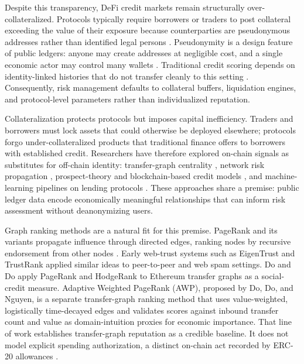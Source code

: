 Despite this transparency, DeFi credit markets remain structurally over-collateralized. Protocols typically require borrowers or traders to post collateral exceeding the value of their exposure because counterparties are pseudonymous addresses rather than identified legal persons . Pseudonymity is a design feature of public ledgers: anyone may create addresses at negligible cost, and a single economic actor may control many wallets . Traditional credit scoring depends on identity-linked histories that do not transfer cleanly to this setting . Consequently, risk management defaults to collateral buffers, liquidation engines, and protocol-level parameters rather than individualized reputation.

Collateralization protects protocols but imposes capital inefficiency. Traders and borrowers must lock assets that could otherwise be deployed elsewhere; protocols forgo under-collateralized products that traditional finance offers to borrowers with established credit. Researchers have therefore explored on-chain signals as substitutes for off-chain identity: transfer-graph centrality , network risk propagation , prospect-theory and blockchain-based credit models , and machine-learning pipelines on lending protocols . These approaches share a premise: public ledger data encode economically meaningful relationships that can inform risk assessment without deanonymizing users.

Graph ranking methods are a natural fit for this premise. PageRank and its variants propagate influence through directed edges, ranking nodes by recursive endorsement from other nodes . Early web-trust systems such as EigenTrust  and TrustRank  applied similar ideas to peer-to-peer and web spam settings. Do and Do apply PageRank and HodgeRank to Ethereum transfer graphs as a social-credit measure. Adaptive Weighted PageRank (AWP), proposed by Do, Do, and Nguyen, is a separate transfer-graph ranking method that uses value-weighted, logistically time-decayed edges and validates scores against inbound transfer count and value as domain-intuition proxies for economic importance. That line of work establishes transfer-graph reputation as a credible baseline. It does not model explicit spending authorization, a distinct on-chain act recorded by ERC-20 allowances .


